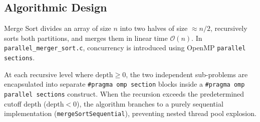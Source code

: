 \documentclass[12pt]{article}
\begin{document}
\subsection{Algorithmic Design}
Merge Sort divides an array of size $n$ into two halves of size $\approx n/2$, recursively sorts both partitions, and merges them in linear time $\mathcal{O}(n)$. In \texttt{parallel\_merger_sort.c}, concurrency is introduced using OpenMP \texttt{parallel sections}. 

At each recursive level where $\text{depth} \ge 0$, the two independent sub-problems are encapsulated into separate \texttt{\#pragma omp section} blocks inside a \texttt{\#pragma omp parallel sections} construct. When the recursion exceeds the predetermined cutoff depth ($\text{depth} < 0$), the algorithm branches to a purely sequential implementation (\texttt{mergeSortSequential}), preventing nested thread pool explosion.
\end{document}
